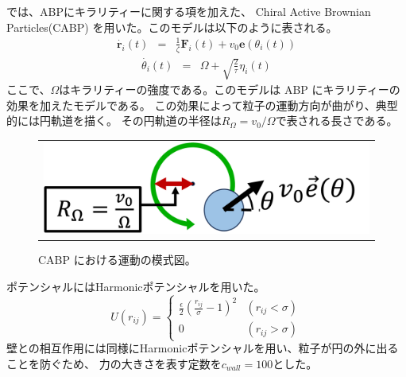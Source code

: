 \documentclass[/Users/ikedahajime/GitHub/reserch/master_report/thesis]{subfiles}
\begin{document}
では、ABPにキラリティーに関する項を加えた、 Chiral Active Brownian Particles(CABP)%
を用いた。このモデルは以下のように表される。
\begin{eqnarray}\label{eq:eom_CABP_1}
    \dot{\bm{r}_i}(t) &=& \frac{1}{\zeta} \bm{F}_i(t)+v_0 \bm{e}(\theta_i (t))
\end{eqnarray}
\begin{eqnarray}\label{eq:eom_CABP_2}
    \dot{\theta_i }(t) &=& \Omega+\sqrt{\frac{2}{\tau}}\eta_i(t)
\end{eqnarray}
ここで、$\Omega$はキラリティーの強度である。このモデルは ABP にキラリティーの効果を加えたモデルである。
この効果によって粒子の運動方向が曲がり、典型的には円軌道を描く。
その円軌道の半径は$R_\Omega=v_0/\Omega$で表される長さである。
\begin{figure}
    \centering
    \begin{tabular}{c}
        \begin{minipage}{0.6\hsize}
            \includegraphics[width=\textwidth]{img/method/cabp_motion.png}
        \end{minipage}
    \end{tabular}
    \caption[Four sample images]
    {
        CABP における運動の模式図。
    }
    \label{fig:sample_four_images}
\end{figure}

ポテンシャルにはHarmonicポテンシャルを用いた。
\begin{equation}
    U(r_{ij})=
    \begin{cases}
        \frac{\epsilon}{2}\left(\frac{r_{ij}}{\sigma}-1\right)^2 &(r_{ij}<\sigma)\\
        0 & (r_{ij}>\sigma)

    \end{cases}
\end{equation}
壁との相互作用には同様にHarmonicポテンシャルを用い、粒子が円の外に出ることを防ぐため、
力の大きさを表す定数を$c_{wall}=100$とした。
\end{document}
